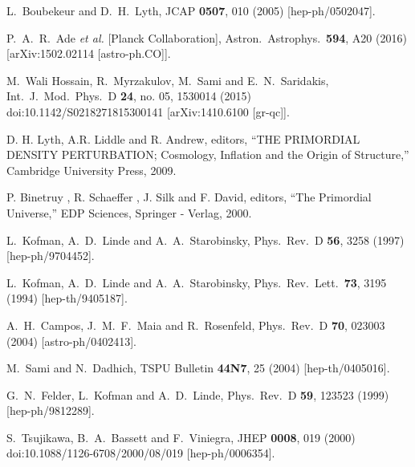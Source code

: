 \documentclass[prd,twocolumn,superscriptaddress]{revtex4}
\begin{document}
\begin{thebibliography}{99}
  L.~Boubekeur and D.~H.~Lyth,
  JCAP {\bf 0507}, 010 (2005)
  [hep-ph/0502047].
  
  P.~A.~R.~Ade {\it et al.} [Planck Collaboration],
  Astron.\ Astrophys.\  {\bf 594}, A20 (2016)
  [arXiv:1502.02114 [astro-ph.CO]].
  
  M.~Wali Hossain, R.~Myrzakulov, M.~Sami and E.~N.~Saridakis,
  Int.\ J.\ Mod.\ Phys.\ D {\bf 24}, no. 05, 1530014 (2015)
  doi:10.1142/S0218271815300141
  [arXiv:1410.6100 [gr-qc]].
  
  D. H. Lyth,   A.R. Liddle and R. Andrew, editors,
  ``THE PRIMORDIAL DENSITY PERTURBATION; Cosmology, Inflation and the Origin of Structure,''
  Cambridge University Press, 2009.
  
  
 P.  Binetruy , R. Schaeffer ,  J.  Silk and  F. David, editors,
  ``The Primordial Universe,''
  EDP Sciences, Springer - Verlag, 2000.
  
  L.~Kofman, A.~D.~Linde and A.~A.~Starobinsky,
  Phys.\ Rev.\ D {\bf 56}, 3258 (1997)
  [hep-ph/9704452].
  
  L.~Kofman, A.~D.~Linde and A.~A.~Starobinsky,
  Phys.\ Rev.\ Lett.\  {\bf 73}, 3195 (1994)
  [hep-th/9405187].
  
  A.~H.~Campos, J.~M.~F.~Maia and R.~Rosenfeld,
  Phys.\ Rev.\ D {\bf 70}, 023003 (2004)
  [astro-ph/0402413].
  
  M.~Sami and N.~Dadhich,
  TSPU Bulletin {\bf 44N7}, 25 (2004)
  [hep-th/0405016].
  
  G.~N.~Felder, L.~Kofman and A.~D.~Linde,
  Phys.\ Rev.\ D {\bf 59}, 123523 (1999)
  [hep-ph/9812289].
  
  S.~Tsujikawa, B.~A.~Bassett and F.~Viniegra,
  JHEP {\bf 0008}, 019 (2000)
  doi:10.1088/1126-6708/2000/08/019
  [hep-ph/0006354].
  

\end{thebibliography}
\end{document}

